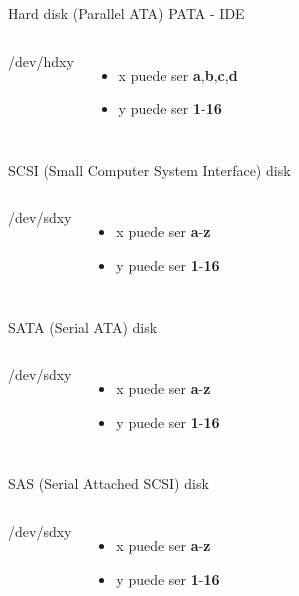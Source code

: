 \begin{frame}[c]{Hard disk (Parallel ATA) PATA - IDE}

  \begin{columns}
      {\huge /dev/hd{\color{red}x}{\color{blue}y}}
      \begin{itemize}
        \item {\color{red}x} puede ser \textbf{a},\textbf{b},\textbf{c},\textbf{d}
        \item {\color{blue}y} puede ser \textbf{1}-\textbf{16}
      \end{itemize}
  \end{columns}
\end{frame}

\begin{frame}[c]{SCSI (Small Computer System Interface) disk}

  \begin{columns}
      {\huge /dev/sd{\color{red}x}{\color{blue}y}}
      \begin{itemize}
        \item {\color{red}x} puede ser \textbf{a}-\textbf{z}
        \item {\color{blue}y} puede ser \textbf{1}-\textbf{16}
      \end{itemize}
  \end{columns}
\end{frame}

\begin{frame}[c]{SATA (Serial ATA) disk}

  \begin{columns}
      {\huge /dev/sd{\color{red}x}{\color{blue}y}}
      \begin{itemize}
        \item {\color{red}x} puede ser \textbf{a}-\textbf{z}
        \item {\color{blue}y} puede ser \textbf{1}-\textbf{16}
      \end{itemize}
  \end{columns}
\end{frame}

\begin{frame}[c]{SAS (Serial Attached SCSI) disk}

  \begin{columns}
      {\huge /dev/sd{\color{red}x}{\color{blue}y}}
      \begin{itemize}
        \item {\color{red}x} puede ser \textbf{a}-\textbf{z}
        \item {\color{blue}y} puede ser \textbf{1}-\textbf{16}
      \end{itemize}
  \end{columns}
\end{frame}

